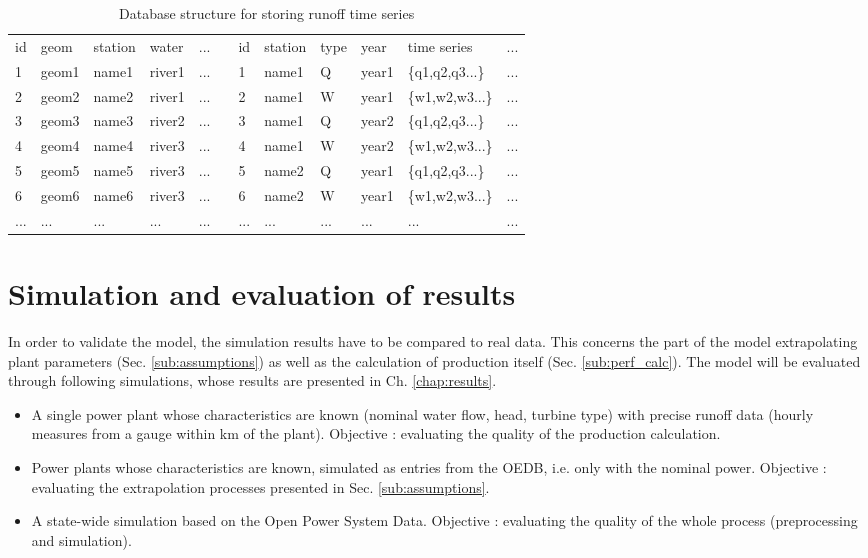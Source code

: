 \begin{table}[H]
\footnotesize
  \centering
  \caption{Database structure for storing runoff time series}
  \label{db_struct}
  \begin{tabular}{|l|l|l|l|ll|l|l|l|l|l|l}
  \cline{1-5}\cline{7-12}
  id & geom &station & water & ...&& id & station & type & year & time series & ...\\
  \cline{1-5}\cline{7-12}
  1&geom1&name1&river1&...&&1&name1&Q&year1&\{q1,q2,q3...\}&...\\\cline{1-5}\cline{7-12}
  2&geom2&name2&river1&...&&2&name1&W&year1&\{w1,w2,w3...\}&...\\\cline{1-5}\cline{7-12}
  3&geom3&name3&river2&...&&3&name1&Q&year2&\{q1,q2,q3...\}&...\\\cline{1-5}\cline{7-12}
  4&geom4&name4&river3&...&&4&name1&W&year2&\{w1,w2,w3...\}&...\\\cline{1-5}\cline{7-12}
  5&geom5&name5&river3&...&&5&name2&Q&year1&\{q1,q2,q3...\}&...\\\cline{1-5}\cline{7-12}
  6&geom6&name6&river3&...&&6&name2&W&year1&\{w1,w2,w3...\}&...\\\cline{1-5}\cline{7-12}
  ...&...&...&...&...&&...&...&...&...&...&...\\
  \end{tabular}
\end{table}


\section{Simulation and evaluation of results}

\label{sec:simu_res}

In order to validate the model, the simulation results have to be compared to real data. This concerns the part of the model extrapolating plant parameters (Sec. \ref{sub:assumptions}) as well as the calculation of production itself (Sec. \ref{sub:perf_calc}). \newline
The model will be evaluated through following simulations, whose results are presented in Ch. \ref{chap:results}.
\begin{itemize}
 \item A single power plant whose characteristics are known (nominal water flow, head, turbine type) with precise runoff data (hourly measures from a gauge within \unit[2]{km} of the plant). Objective : evaluating the quality of the production calculation.
 \item Power plants whose characteristics are known, simulated as entries from the OEDB, i.e. only with the nominal power. Objective : evaluating the extrapolation processes presented in Sec. \ref{sub:assumptions}.
 \item A state-wide simulation based on the Open Power System Data. Objective : evaluating the quality of the whole process (preprocessing and simulation).
\end{itemize}

